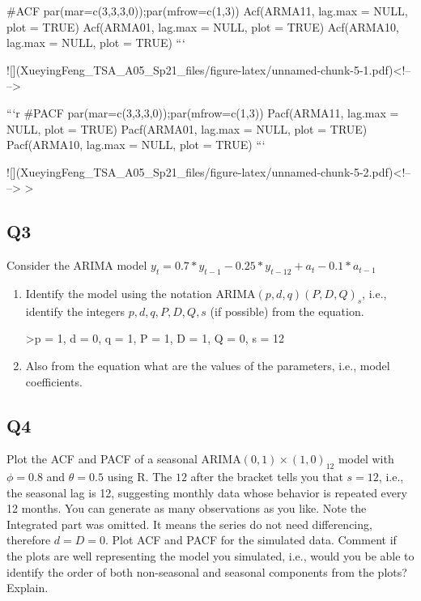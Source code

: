 \documentclass[
]{article}
\begin{document}
\begin{enumerate}[label=(\alph*)]
#ACF
par(mar=c(3,3,3,0));par(mfrow=c(1,3))
Acf(ARMA11, lag.max = NULL, plot = TRUE)
Acf(ARMA01, lag.max = NULL, plot = TRUE)
Acf(ARMA10, lag.max = NULL, plot = TRUE)
```

![](XueyingFeng_TSA_A05_Sp21_files/figure-latex/unnamed-chunk-5-1.pdf)<!-- --> 

```r
#PACF
par(mar=c(3,3,3,0));par(mfrow=c(1,3))
Pacf(ARMA11, lag.max = NULL, plot = TRUE)
Pacf(ARMA01, lag.max = NULL, plot = TRUE)
Pacf(ARMA10, lag.max = NULL, plot = TRUE)
```

![](XueyingFeng_TSA_A05_Sp21_files/figure-latex/unnamed-chunk-5-2.pdf)<!-- --> 
>

\end{enumerate}

\hypertarget{q3}{%
\subsection{Q3}\label{q3}}

Consider the ARIMA model
\(y_t=0.7*y_{t-1}-0.25*y_{t-12}+a_t-0.1*a_{t-1}\)

\begin{enumerate}[label=(\alph*)]

\item Identify the model using the notation ARIMA$(p,d,q)(P,D,Q)_ s$, i.e., identify the integers $p,d,q,P,D,Q,s$ (if possible) from the equation.

>p = 1, d = 0, q = 1, P = 1, D = 1, Q = 0, s = 12


\item Also from the equation what are the values of the parameters, i.e., model coefficients. 

\end{enumerate}

\hypertarget{q4}{%
\subsection{Q4}\label{q4}}

Plot the ACF and PACF of a seasonal ARIMA\((0, 1)\times(1, 0)_{12}\)
model with \(\phi =0 .8\) and \(\theta = 0.5\) using R. The \(12\) after
the bracket tells you that \(s=12\), i.e., the seasonal lag is 12,
suggesting monthly data whose behavior is repeated every 12 months. You
can generate as many observations as you like. Note the Integrated part
was omitted. It means the series do not need differencing, therefore
\(d=D=0\). Plot ACF and PACF for the simulated data. Comment if the
plots are well representing the model you simulated, i.e., would you be
able to identify the order of both non-seasonal and seasonal components
from the plots? Explain.
\end{document}
